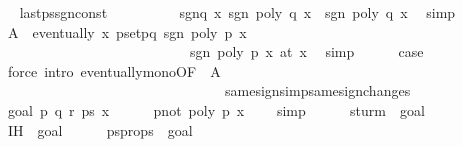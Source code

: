 \begin{isabellebody}
\ \isamarkupfalse%
\ last{\isacharunderscore}ps{\isacharunderscore}sgn{\isacharunderscore}const\isanewline
\ \ \ \ \ \ \ \ \isamarkupfalse%
\ sgn{\isacharunderscore}q{\isacharcolon}\ {\isachardoublequoteopen}{\isasymAnd}x{\isachardot}\ sgn\ {\isacharparenleft}poly\ q\ x{\isacharparenright}\ {\isacharequal}\ sgn\ {\isacharparenleft}poly\ q\ x\ \isamarkupfalse%
\ simp\isanewline
\ \ \ \ \isamarkupfalse%
\ \isamarkupfalse%
\ A{\isacharcolon}\ \ {\isachardoublequoteopen}eventually\ {\isacharparenleft}{\isasymlambda}x{\isachardot}\ {\isasymforall}p{\isasymin}set{\isacharbrackleft}p{\isacharcomma}q{\isacharbrackright}{\isachardot}\ sgn\ {\isacharparenleft}poly\ p\ x{\isacharparenright}\ {\isacharequal}\ \isanewline
\ \ \ \ \ \ \ \ \ \ \ \ \ \ \ \ \ \ \ \ \ \ \ \ \ \ \ sgn\ {\isacharparenleft}poly\ p\ x\ {\isacharparenleft}at\ x\ \isamarkupfalse%
\ simp\isanewline
\ \ \ \ \isamarkupfalse%
\ {\isacharquery}case\ \isamarkupfalse%
\ {\isacharparenleft}force\ intro{\isacharcolon}\ eventually{\isacharunderscore}mono{\isacharbrackleft}OF\ {\isacharunderscore}\ A{\isacharbrackright}\ \isanewline
\ \ \ \ \ \ \ \ \ \ \ \ \ \ \ \ \ \ \ \ \ \ \ \ \ \ \ \ \ \ \ \ same{\isacharunderscore}signs{\isacharunderscore}imp{\isacharunderscore}same{\isacharunderscore}sign{\isacharunderscore}changes{\isacharprime}{\isacharparenright}\isanewline
{}\isamarkupfalse%
\isanewline
\ \ \isamarkupfalse%
\ {\isacharparenleft}goal{}\ p\ q\ r\ ps{\isacharprime}{\isacharprime}\ x\isanewline
\ \ \ \ \isamarkupfalse%
\ p{\isacharunderscore}not{\isacharunderscore}{}{\isacharcolon}\ {\isachardoublequoteopen}poly\ p\ x\ {\isasymnoteq}\ {}{\isachardoublequoteclose}\ \isamarkupfalse%
\ simp\isanewline
\ \ \ \ \isamarkupfalse%
\ sturm\ {\isacharequal}\ goal{}{\isacharparenleft}{}{\isacharparenright}\isanewline
\ \ \ \ \isamarkupfalse%
\ IH\ {\isacharequal}\ goal{}{\isacharparenleft}{}{\isacharcomma}{}{\isacharparenright}\isanewline
\ \ \ \ \isamarkupfalse%
\ ps{\isacharprime}{\isacharprime}{\isacharunderscore}props\ {\isacharequal}\ goal{}{\isacharparenleft}{}{\isacharparenright}\isanewline

\end{isabellebody}
